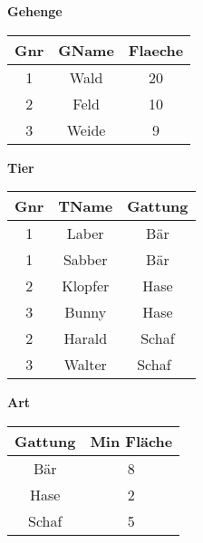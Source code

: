 

\begin{table}[H]
    \scriptsize
    \centering
    \begin{minipage}[t]{0.3\textwidth}
        \centering
        \textbf{Gehenge} \\[3pt]
        \begin{tabular}{|c|c|c|}
            \hline
            \textbf{Gnr} & \textbf{GName} & \textbf{Flaeche} \\
            \hline
            1 & Wald & 20 \\
            \hline
            2 & Feld & 10 \\
            \hline
            3 & Weide & 9 \\
            \hline
        \end{tabular}
    \end{minipage}
    \hspace{0.2cm}
    \begin{minipage}[t]{0.3\textwidth}
        \centering
        \textbf{Tier} \\[3pt]
        \begin{tabular}{|c|c|c|}
            \hline
            \textbf{Gnr} & \textbf{TName} & \textbf{Gattung} \\
            \hline
            1 & Laber & Bär \\
            \hline
            1 & Sabber & Bär \\
            \hline
            2 & Klopfer & Hase \\
            \hline
            3 & Bunny & Hase \\
            \hline
            2 & Harald & Schaf \\
            \hline
            3 & Walter & Schaf \\
            \hline
        \end{tabular}
    \end{minipage}
    \hspace{0.2cm}
    \begin{minipage}[t]{0.3\textwidth}
        \centering
        \textbf{Art} \\[3pt]
        \begin{tabular}{|c|c|}
            \hline
            \textbf{Gattung} & \textbf{Min Fläche} \\
            \hline
            Bär & 8 \\
            \hline
            Hase & 2 \\
            \hline
            Schaf & 5 \\
            \hline
        \end{tabular}
    \end{minipage}
\end{table}


